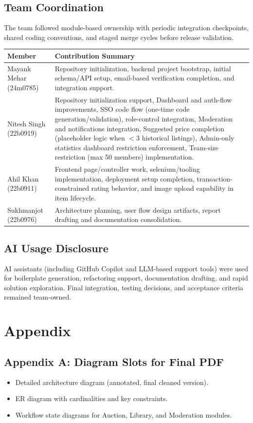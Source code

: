 \documentclass[12pt,a4paper]{article}
\begin{document}
\subsection*{Team Coordination}
The team followed module-based ownership with periodic integration checkpoints, shared coding conventions, and staged merge cycles before release validation.

\begin{longtable}{p{} p{}}
\toprule
\textbf{Member} & \textbf{Contribution Summary} \\
\midrule
Mayank Mehar (24m0785) & Repository initialization, backend project bootstrap, initial schema/API setup, email-based verification completion, and integration support. \\
Nitesh Singh (22b0919) & Repository initialization support, Dashboard and auth-flow improvements, SSO code flow (one-time code generation/validation), role-control integration, Moderation and notifications integration, Suggested price completion (placeholder logic when $<3$ historical listings), Admin-only statistics dashboard restriction enforcement, Team-size restriction (max 50 members) implementation. \\
Ahil Khan (22b0911) & Frontend page/controller work, selenium/tooling implementation, deployment setup completion, transaction-constrained rating behavior, and image upload capability in item lifecycle. \\
Sukhmanjot (22b0976) & Architecture planning, user flow design artifacts, report drafting and documentation consolidation. \\
\bottomrule
\end{longtable}

\subsection*{AI Usage Disclosure}
AI assistants (including GitHub Copilot and LLM-based support tools) were used for boilerplate generation, refactoring support, documentation drafting, and rapid solution exploration. Final integration, testing decisions, and acceptance criteria remained team-owned.

\newpage
\section{Appendix}

\subsection{Appendix A: Diagram Slots for Final PDF}
\begin{itemize}[leftmargin=*]
    \item Detailed architecture diagram (annotated, final cleaned version).
    \item ER diagram with cardinalities and key constraints.
    \item Workflow state diagrams for Auction, Library, and Moderation modules.
\end{itemize}
\end{document}
